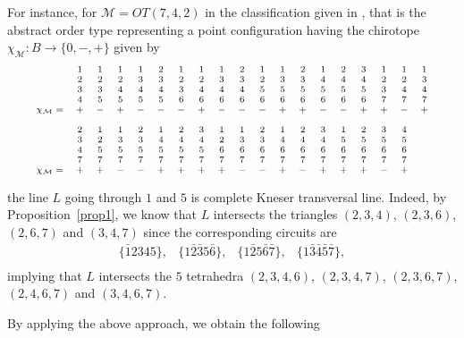 \documentclass[11pt]{amsart}
\theoremstyle{plain}
\theoremstyle{definition}
\theoremstyle{remark}
\begin{document}
For instance, for $\mathcal{M}=OT(7,4,2)$ in the classification given in \cite{F}, that is the abstract order type representing a point configuration having the chirotope $\chi_{\mathcal{M}} : B \rightarrow \{0,-,+\}$ given by
$$
\scriptsize
\begin{array}{ccccccccccccccccccc}
 & 1 & 1 & 1 & 1 & 2 & 1 & 1 & 1 & 2 & 1 & 1 & 2 & 1 & 2 & 3 & 1 & 1 & 1  \\
 & 2 & 2 & 2 & 3 & 3 & 2 & 2 & 3 & 3 & 2 & 3 & 3 & 4 & 4 & 4 & 2 & 2 & 3  \\
 & 3 & 3 & 4 & 4 & 4 & 3 & 4 & 4 & 4 & 5 & 5 & 5 & 5 & 5 & 5 & 3 & 4 & 4  \\
 & 4 & 5 & 5 & 5 & 5 & 6 & 6 & 6 & 6 & 6 & 6 & 6 & 6 & 6 & 6 & 7 & 7 & 7  \\
 \chi_{\mathcal{M}} = & + & - & + & - & - & - & + & - & - & - & + & + & - & - & + & + & - & +  \\
 \\
  & 2 & 1 & 1 & 2 & 1 & 2 & 3 & 1 & 1 & 2 & 1 & 2 & 3 & 1 & 2 & 3 & 4 & \\
 & 3 & 2 & 3 & 3 & 4 & 4 & 4 & 2 & 3 & 3 & 4 & 4 & 4 & 5 & 5 & 5 & 5 & \\
 & 4 & 5 & 5 & 5 & 5 & 5 & 5 & 6 & 6 & 6 & 6 & 6 & 6 & 6 & 6 & 6 & 6 & \\
 & 7 & 7 & 7 & 7 & 7 & 7 & 7 & 7 & 7 & 7 & 7 & 7 & 7 & 7 & 7 & 7 & 7 & \\
 \chi_{\mathcal{M}} = & + & + & - & - & + & + & + & + & - & - & + & - & + & + & + & - & +& \\
\end{array}
$$

the line $L$ going through $1$ and $5$ is complete Kneser transversal line. Indeed, by Proposition~\ref{prop1}, we know that $L$ intersects the triangles $(2,3,4)$, $(2,3,6)$, $(2,6,7)$ and $(3,4,7)$ since the corresponding circuits are
$$
\begin{array}{cccc}
\{\bar{1}2345\}, & \{1\bar{2}\bar{3}5\bar{6}\}, & \{1\bar{2}5\bar{6}\bar{7}\}, & \{1\bar{3}\bar{4}\bar{5}\bar{7}\},\\
\end{array}
$$
implying  that $L$ intersects the $5$ tetrahedra $(2,3,4,6)$, $(2,3,4,7)$, $(2,3,6,7)$, $(2,4,6,7)$ and $(3,4,6,7)$.
\medskip

By applying the above approach, we obtain the following
\end{document}
